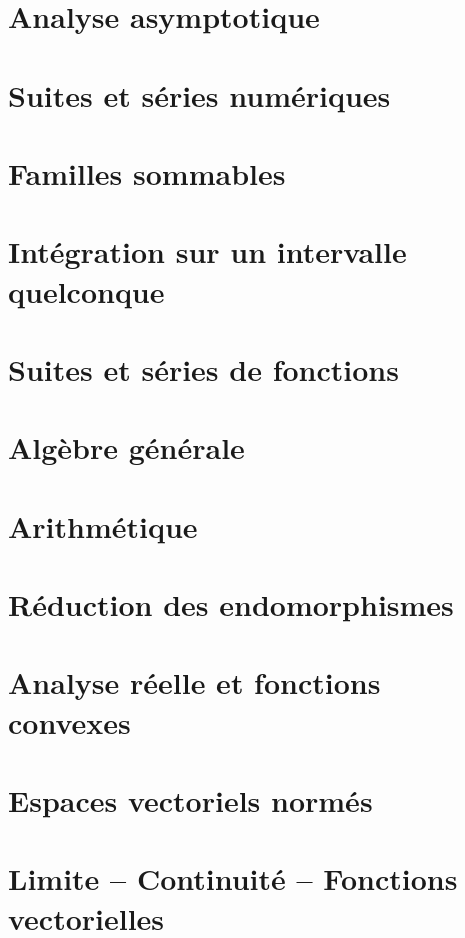 \documentclass{report}
\begin{document}
\newpage

\pagestyle{main}

\chapter{Analyse asymptotique}

\chapter{Suites et séries numériques}

\chapter{Familles sommables}

\chapter{Intégration sur un intervalle quelconque}

\chapter{Suites et séries de fonctions}

\chapter{Algèbre générale}

\chapter{Arithmétique}

\chapter{Réduction des endomorphismes}

\chapter{Analyse réelle et fonctions convexes}

\chapter{Espaces vectoriels normés}

\chapter{Limite -- Continuité -- Fonctions vectorielles}
\end{document}
